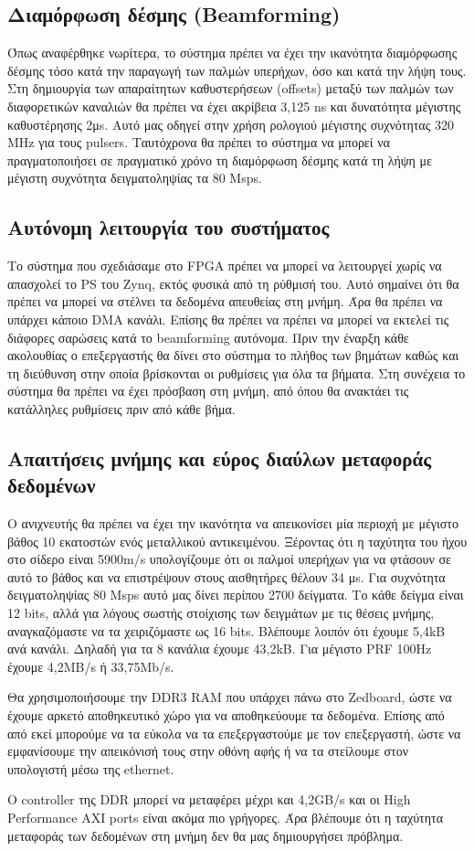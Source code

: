 \documentclass[12pt,a4paper]{book}
\begin{document}
\subsection{Διαμόρφωση δέσμης (Beamforming)}
Όπως αναφέρθηκε νωρίτερα, το σύστημα πρέπει να έχει την ικανότητα διαμόρφωσης δέσμης τόσο κατά την παραγωγή των παλμών υπερήχων, όσο και κατά την λήψη τους. Στη δημιουργία των απαραίτητων καθυστερήσεων (offsets) μεταξύ των παλμών των διαφορετικών καναλιών θα πρέπει να έχει ακρίβεια 3,125 ns και δυνατότητα μέγιστης καθυστέρησης 2μs. Αυτό μας οδηγεί στην χρήση ρολογιού μέγιστης συχνότητας 320 MHz για τους pulsers. Ταυτόχρονα θα πρέπει το σύστημα να μπορεί να πραγματοποιήσει σε πραγματικό χρόνο τη διαμόρφωση δέσμης κατά τη λήψη με μέγιστη συχνότητα δειγματοληψίας τα 80 Msps.


\subsection{Αυτόνομη λειτουργία του συστήματος}
Το σύστημα που σχεδιάσαμε στο FPGA πρέπει να μπορεί να λειτουργεί χωρίς να απασχολεί το PS του Zynq, εκτός φυσικά από τη ρύθμισή του. Αυτό σημαίνει ότι θα πρέπει να μπορεί να στέλνει τα δεδομένα απευθείας στη μνήμη. Άρα θα πρέπει να υπάρχει κάποιο DMA κανάλι. 
Επίσης θα πρέπει να πρέπει να μπορεί να εκτελεί τις διάφορες σαρώσεις κατά το beamforming αυτόνομα. Πριν την έναρξη κάθε ακολουθίας ο επεξεργαστής θα δίνει στο σύστημα το πλήθος των βημάτων καθώς και τη διεύθυνση στην οποία βρίσκονται οι ρυθμίσεις για όλα τα βήματα. Στη συνέχεια το σύστημα θα πρέπει να έχει πρόσβαση στη μνήμη, από όπου θα ανακτάει τις κατάλληλες ρυθμίσεις πριν από κάθε βήμα. 

\subsection{Απαιτήσεις μνήμης και εύρος διαύλων μεταφοράς δεδομένων}
Ο ανιχνευτής θα πρέπει να έχει την ικανότητα να απεικονίσει μία περιοχή με μέγιστο βάθος 10 εκατοστών ενός μεταλλικού αντικειμένου. Ξέροντας ότι η ταχύτητα του ήχου στο σίδερο είναι 5900m/s υπολογίζουμε ότι οι παλμοί υπερήχων για να φτάσουν σε αυτό το βάθος και να επιστρέψουν στους αισθητήρες θέλουν 34 μs. Για συχνότητα δειγματοληψίας 80 Msps αυτό μας δίνει περίπου 2700 δείγματα. Το κάθε δείγμα είναι 12 bits, αλλά για λόγους σωστής στοίχισης των δειγμάτων με τις θέσεις μνήμης, αναγκαζόμαστε να τα χειριζόμαστε ως 16 bits. Βλέπουμε λοιπόν ότι έχουμε 5,4kB ανά κανάλι. Δηλαδή για τα 8 κανάλια έχουμε 43,2kB. Για μέγιστο PRF 100Hz έχουμε 4,2MB/s ή 33,75Mb/s.

Θα χρησιμοποιήσουμε την DDR3 RAM που υπάρχει πάνω στο Zedboard, ώστε να έχουμε αρκετό αποθηκευτικό χώρο για να αποθηκεύουμε τα δεδομένα. Επίσης από από εκεί μπορούμε να τα εύκολα να τα επεξεργαστούμε με τον επεξεργαστή, ώστε να εμφανίσουμε την απεικόνισή τους στην οθόνη αφής ή να τα στείλουμε στον υπολογιστή μέσω της ethernet. 

Ο controller της DDR μπορεί να μεταφέρει μέχρι και 4,2GB/s και οι High Performance AXI ports είναι ακόμα πιο γρήγορες. Άρα βλέπουμε ότι η ταχύτητα μεταφοράς των δεδομένων στη μνήμη δεν θα μας δημιουργήσει πρόβλημα.
\end{document}
